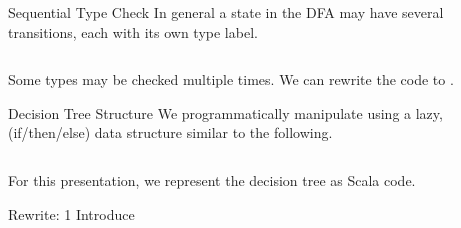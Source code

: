 \newsavebox\typecaseKbox
\begin{lrbox}{\typecaseKbox}
  \begin{minipage}{8cm}
    
  \end{minipage}
\end{lrbox}


\newsavebox\typecaseKhbox
\begin{lrbox}{\typecaseKhbox}
  \begin{minipage}{8cm}
    
  \end{minipage}
\end{lrbox}



\begin{frame}{Sequential Type Check}
  In general a state in the DFA may have several  transitions, each with its own type label.
  \begin{columns}
    \begin{column}{0.5\textwidth}
      \usebox\typecaseAbox
    \end{column}
    \begin{column}{0.5\textwidth}  %
      \scalebox{0.9}{}
    \end{column}    
  \end{columns}

  Some types may be checked multiple times.  We can rewrite the code to .
\end{frame}

\begin{frame}{Decision Tree Structure}
  We programmatically manipulate  using a lazy,  (if/then/else) data structure similar to the following.

  \begin{columns}
    \begin{column}{0.5\textwidth}
      \usebox\typecaseAbox
    \end{column}
    \begin{column}{0.5\textwidth}  %
      \usebox\typecaseITEbox
    \end{column}    
  \end{columns}

  For this presentation, we represent the decision tree as  Scala code.
\end{frame}



\begin{frame}{Rewrite: 1}
  Introduce \colorbox{pink!30}{}

  \begin{columns}
    \begin{column}{0.5\textwidth}
      \usebox\typecaseAbox
    \end{column}
    \begin{column}{0.5\textwidth}  %
    \end{column}    
  \end{columns}
\end{frame}

